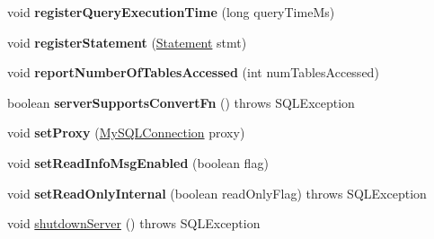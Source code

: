 \begin{DoxyCompactItemize}
void {\bfseries register\+Query\+Execution\+Time} (long query\+Time\+Ms)
\item 
\mbox{\label{interfacecom_1_1mysql_1_1jdbc_1_1_my_s_q_l_connection_a4c71255ef0bfe14f8f30f5274816a795}} 
void {\bfseries register\+Statement} (\mbox{\hyperlink{interfacecom_1_1mysql_1_1jdbc_1_1_statement}{Statement}} stmt)
\item 
\mbox{\label{interfacecom_1_1mysql_1_1jdbc_1_1_my_s_q_l_connection_a0af16a15eacce5941db17eefc1979bf0}} 
void {\bfseries report\+Number\+Of\+Tables\+Accessed} (int num\+Tables\+Accessed)
\item 
\mbox{\label{interfacecom_1_1mysql_1_1jdbc_1_1_my_s_q_l_connection_a1c0a6a0b1b1bacff4edc493d2864b2fc}} 
boolean {\bfseries server\+Supports\+Convert\+Fn} ()  throws S\+Q\+L\+Exception
\item 
\mbox{\label{interfacecom_1_1mysql_1_1jdbc_1_1_my_s_q_l_connection_a24114428cee3742ad1b457789945bc45}} 
void {\bfseries set\+Proxy} (\mbox{\hyperlink{interfacecom_1_1mysql_1_1jdbc_1_1_my_s_q_l_connection}{My\+S\+Q\+L\+Connection}} proxy)
\item 
\mbox{\label{interfacecom_1_1mysql_1_1jdbc_1_1_my_s_q_l_connection_af2de4d971a672a0f4fd783429bde04ff}} 
void {\bfseries set\+Read\+Info\+Msg\+Enabled} (boolean flag)
\item 
\mbox{\label{interfacecom_1_1mysql_1_1jdbc_1_1_my_s_q_l_connection_af7d9864a3709ccf3976dfa563fb064f5}} 
void {\bfseries set\+Read\+Only\+Internal} (boolean read\+Only\+Flag)  throws S\+Q\+L\+Exception
\item 
void \mbox{\hyperlink{interfacecom_1_1mysql_1_1jdbc_1_1_my_s_q_l_connection_ab6fa367972e51a54bc186f7856568098}{shutdown\+Server}} ()  throws S\+Q\+L\+Exception
\item 
\mbox{\label{interfacecom_1_1mysql_1_1jdbc_1_1_my_s_q_l_connection_a80b6b7cf1059ecc16f03c312d8ff35f5}} 

\end{DoxyCompactItemize}
